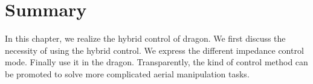 \section{Summary}
In this chapter, we realize the hybrid control of dragon. We first discuss the necessity of using the hybrid control. We express the different impedance control mode. Finally use it in the dragon. Transparently, the kind of control method can be promoted to solve more complicated aerial manipulation tasks.
